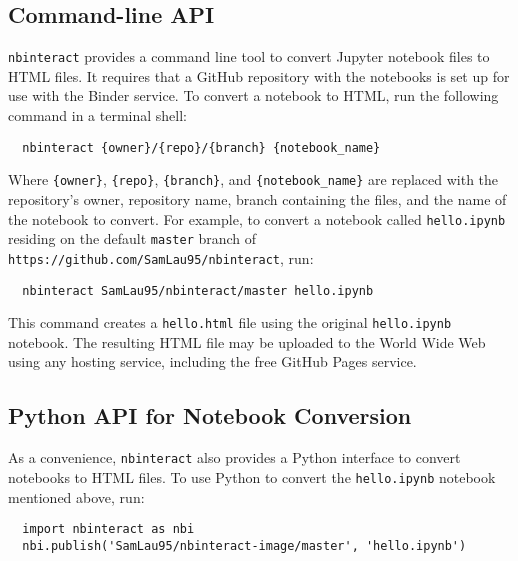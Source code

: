 \documentclass[nobib]{tufte-handout}
\newcommand{\code}[1]{\texttt{#1}}
\begin{document}

\subsection{Command-line API} %
\label{sub:command_line_api}

\code{nbinteract} provides a command line tool to convert Jupyter notebook
files to HTML files. It requires that a GitHub repository with the notebooks is
set up for use with the Binder service. To convert a notebook to HTML, run the
following command in a terminal shell:

\begin{verbatim}
  nbinteract {owner}/{repo}/{branch} {notebook_name}
\end{verbatim}

Where \code{\{owner\}}, \code{\{repo\}}, \code{\{branch\}}, and
\verb|{notebook_name}| are replaced with the repository's owner, repository
name, branch containing the files, and the name of the notebook to convert. For
example, to convert a notebook called \code{hello.ipynb} residing on the
default \code{master} branch of \code{https://github.com/SamLau95/nbinteract},
run:

\begin{verbatim}
  nbinteract SamLau95/nbinteract/master hello.ipynb
\end{verbatim}

This command creates a \code{hello.html} file using the original
\code{hello.ipynb} notebook. The resulting HTML file may be
uploaded to the World Wide Web using any hosting service, including the free
GitHub Pages service.


\subsection{Python API for Notebook Conversion} %
\label{sub:python_api}

As a convenience, \code{nbinteract} also provides a Python interface to convert
notebooks to HTML files. To use Python to convert the \code{hello.ipynb}
notebook mentioned above, run:

\begin{verbatim}
  import nbinteract as nbi
  nbi.publish('SamLau95/nbinteract-image/master', 'hello.ipynb')
\end{verbatim}
\end{document}

